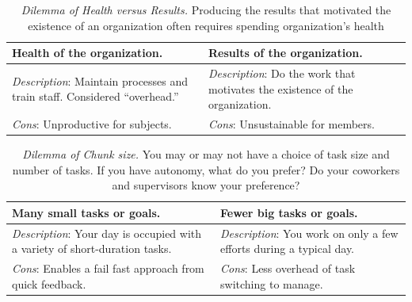 

\begin{center}
\begin{table}[H] %
\begin{tabular}{ | m{\dilemmatablewidth}| m{\dilemmatablewidth} | } 
  \hline
  \textbf{Health of the organization.} & 
  \textbf{Results of the organization.} \\ 
  \hline
  \textit{Description}: Maintain processes and train staff. Considered ``overhead.'' & 
  \textit{Description}: Do the work that motivates the existence of the organization. \\  
    \hline
  \textit{Cons}: Unproductive for subjects. & 
  \textit{Cons}: Unsustainable for members. \\
  \hline
\end{tabular}
\caption{
\textit{Dilemma of Health versus Results.}
 Producing the results that motivated the existence of an organization often requires spending organization's health
}
\label{table:health-vs-results}
\end{table}
\end{center}


\begin{center}
\begin{table}[H] %
\begin{tabular}{ | m{\dilemmatablewidth}| m{\dilemmatablewidth} | } 
  \hline
  \textbf{Many small tasks or goals.} & 
  \textbf{Fewer big tasks or goals.} \\ 
  \hline
  \textit{Description}: Your day is occupied with a variety of short-duration tasks. & 
  \textit{Description}: You work on only a few efforts during a typical day. \\  
    \hline
  \textit{Cons}: Enables a fail fast approach from quick feedback. & 
  \textit{Cons}: Less overhead of task switching to manage. \\
  \hline
\end{tabular}
\caption{
\textit{Dilemma of Chunk size.}
You may or may not have a choice of task size and number of tasks. If you have autonomy, what do you prefer? Do your coworkers and supervisors know your preference? 
}
\label{table:chunk-size}
\end{table}
\end{center}

